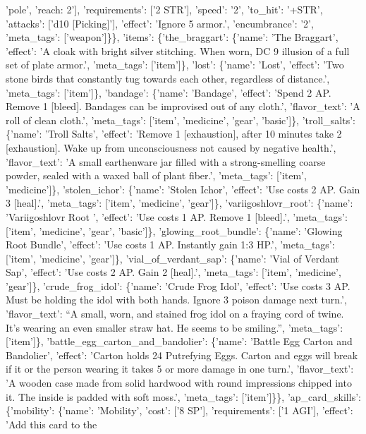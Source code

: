 \documentclass[
  letterpaper,
  DIV=11,
  numbers=noendperiod]{scrartcl}
\begin{document}
{'pole', 'reach: 2'{]}, 'requirements': {[}'2 STR'{]}, 'speed': '2',
'to\_hit': '+STR', 'attacks': {[}'d10 {[}Picking{]}'{]}, 'effect':
'Ignore 5 armor.', 'encumbrance': '2', 'meta\_tags': {[}'weapon'{]}\}\},
'items': \{'the\_braggart': \{'name': 'The Braggart', 'effect': 'A cloak
with bright silver stitching. When worn, DC 9 illusion of a full set of
plate armor.', 'meta\_tags': {[}'item'{]}\}, 'lost': \{'name': 'Lost',
'effect': 'Two stone birds that constantly tug towards each other,
regardless of distance.', 'meta\_tags': {[}'item'{]}\}, 'bandage':
\{'name': 'Bandage', 'effect': 'Spend 2 AP. Remove 1 {[}bleed{]}.
Bandages can be improvised out of any cloth.', 'flavor\_text': 'A roll
of clean cloth.', 'meta\_tags': {[}'item', 'medicine', 'gear',
'basic'{]}\}, 'troll\_salts': \{'name': 'Troll Salts', 'effect': 'Remove
1 {[}exhaustion{]}, after 10 minutes take 2 {[}exhaustion{]}. Wake up
from unconsciousness not caused by negative health.', 'flavor\_text': 'A
small earthenware jar filled with a strong-smelling coarse powder,
sealed with a waxed ball of plant fiber.', 'meta\_tags': {[}'item',
'medicine'{]}\}, 'stolen\_ichor': \{'name': 'Stolen Ichor', 'effect':
'Use costs 2 AP. Gain 3 {[}heal{]}.', 'meta\_tags': {[}'item',
'medicine', 'gear'{]}\}, 'variigoshlovr\_root': \{'name': 'Variigoshlovr
Root ', 'effect': 'Use costs 1 AP. Remove 1 {[}bleed{]}.', 'meta\_tags':
{[}'item', 'medicine', 'gear', 'basic'{]}\}, 'glowing\_root\_bundle':
\{'name': 'Glowing Root Bundle', 'effect': 'Use costs 1 AP. Instantly
gain 1:3 HP.', 'meta\_tags': {[}'item', 'medicine', 'gear'{]}\},
'vial\_of\_verdant\_sap': \{'name': 'Vial of Verdant Sap', 'effect':
'Use costs 2 AP. Gain 2 {[}heal{]}.', 'meta\_tags': {[}'item',
'medicine', 'gear'{]}\}, 'crude\_frog\_idol': \{'name': 'Crude Frog
Idol', 'effect': 'Use costs 3 AP. Must be holding the idol with both
hands. Ignore 3 poison damage next turn.', 'flavor\_text': ``A small,
worn, and stained frog idol on a fraying cord of twine. It's wearing an
even smaller straw hat. He seems to be smiling.'', 'meta\_tags':
{[}'item'{]}\}, 'battle\_egg\_carton\_and\_bandolier': \{'name': 'Battle
Egg Carton and Bandolier', 'effect': 'Carton holds 24 Putrefying Eggs.
Carton and eggs will break if it or the person wearing it takes 5 or
more damage in one turn.', 'flavor\_text': 'A wooden case made from
solid hardwood with round impressions chipped into it. The inside is
padded with soft moss.', 'meta\_tags': {[}'item'{]}\}\},
'ap\_card\_skills': \{'mobility': \{'name': 'Mobility', 'cost': {[}'8
SP'{]}, 'requirements': {[}'1 AGI'{]}, 'effect': 'Add this card to the
}
\end{document}
